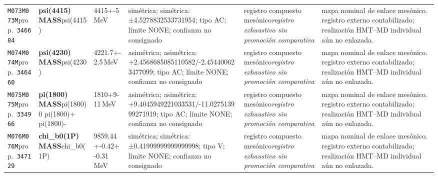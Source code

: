 \begin{landscape}
\begin{longtable}{L{1.85cm}L{4.45cm}L{2.35cm}L{4.05cm}L{3.35cm}L{7.15cm}}
\texttt{M073}\newline \texttt{M073M}\newline prop.\ \texttt{346684} & \textbf{psi(4415) MASS}\newline psi(4415) & 4415+-5\,MeV & simétrica; simétrica: ±4.5278832533731954; tipo AC; límite NONE; confianza no consignado & registro compuesto mesónico\newline \emph{registro exhaustivo sin promoción comparativa} & mapa nominal de enlace mesónico. registro externo contabilizado; realización HMT--MD individual aún no enlazada. \\
\texttt{M074}\newline \texttt{M074M}\newline prop.\ \texttt{346460} & \textbf{psi(4230) MASS}\newline psi(4230) & 4221.7+-2.5\,MeV & asimétrica; asimétrica: +2.4568685085110582/-2.454400623477099; tipo AC; límite NONE; confianza no consignado & registro compuesto mesónico\newline \emph{registro exhaustivo sin promoción comparativa} & mapa nominal de enlace mesónico. registro externo contabilizado; realización HMT--MD individual aún no enlazada. \\
\texttt{M075}\newline \texttt{M075M}\newline prop.\ \texttt{334966} & \textbf{pi(1800) MASS}\newline pi(1800)0 \textbar{}\allowbreak{} pi(1800)+ \textbar{}\allowbreak{} pi(1800)- & 1810+9-11\,MeV & asimétrica; asimétrica: +9.4045949221033531/-11.027513999271919; tipo AC; límite NONE; confianza no consignado & registro compuesto mesónico\newline \emph{registro exhaustivo sin promoción comparativa} & mapa nominal de enlace mesónico. registro externo contabilizado; realización HMT--MD individual aún no enlazada. \\
\texttt{M076}\newline \texttt{M076M}\newline prop.\ \texttt{347129} & \textbf{chi\_\allowbreak{}b0(1P) MASS}\newline chi\_\allowbreak{}b0(1P) & 9859.44+-0.42+-0.31\,MeV & simétrica; simétrica: ±0.41999999999999998; tipo V; límite NONE; confianza no consignado & registro compuesto mesónico\newline \emph{registro exhaustivo sin promoción comparativa} & mapa nominal de enlace mesónico. registro externo contabilizado; realización HMT--MD individual aún no enlazada. \\

\end{longtable}
\end{landscape}
